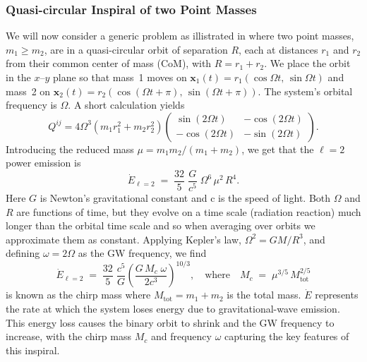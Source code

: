 \documentclass[10pt]{article}
\begin{document}
\subsubsection{Quasi-circular Inspiral of two Point Masses}
\label{subsec:two_mass_example}
We will now consider a generic problem as illistrated in \cite{intoGRSarp} where two point masses, \(m_1 \ge m_2\), are in a quasi-circular orbit of separation \(R\),
each at distances \(r_1\) and \(r_2\) from their common center of mass (CoM), with
\(R = r_1 + r_2\). We place the orbit in the \(x\)--\(y\) plane so that mass~1 moves on
\(\mathbf{x}_1(t) = r_1(\cos\Omega t,\,\sin\Omega t)\) and mass~2 on
\(\mathbf{x}_2(t) = r_2(\cos(\Omega t+\pi),\,\sin(\Omega t+\pi))\). The system’s orbital
frequency is \(\Omega\). A short calculation yields
%
\begin{equation}
    Q^{ij} = 4 \Omega^3 \left(m_1 r_1^2 + m_2 r_2^2\right)
    \begin{pmatrix}
    \sin(2\Omega t) & -\cos(2\Omega t) \\
    -\cos(2\Omega t) & -\sin(2\Omega t)
    \end{pmatrix}.
\end{equation}
%
%
Introducing the reduced mass \(\mu = m_1 m_2/(m_1 + m_2)\), we get that the \(\ell=2\) power emission is
%
\begin{equation}\label{eq:E_dot_2}
\dot{E}_{\ell=2}
\;=\;
\frac{32}{5}\;\frac{G}{c^5}\;\Omega^6\,\mu^2\,R^4.
\end{equation}
Here \(G\) is Newton's gravitational constant and c is the speed of light. Both \(\Omega\) and \(R\) are functions of time, but they evolve on a time scale (radiation reaction) much longer than the orbital time
scale and so when averaging over orbits we approximate them as constant. Applying Kepler’s law, \(\Omega^2 = GM/R^3\), and defining
\(\omega = 2\Omega\) as the GW frequency, we find
%
%
\begin{equation}
\dot{E}_{\ell=2}
\;=\;
\frac{32}{5}\;\frac{c^5}{G}
\left(\frac{G\, M_c \;\omega}{2c^3}\right)^{10/3},
\quad
\text{where}
\quad
M_c \;=\;\mu^{3/5}\,M_{\text{tot}}^{2/5}
\label{eq:Energy}
\end{equation}
%
is known as the chirp mass where $M_{\text{tot}} = m_1+m_2$ is the total mass.
%
%
$ \dot{E} $ represents the rate at which the system loses energy due to gravitational-wave emission.
This energy loss causes the binary orbit to shrink and the GW frequency to increase, 
with the chirp mass \(M_c\) and frequency \(\omega\) capturing the key features of this inspiral.
%
\end{document}
